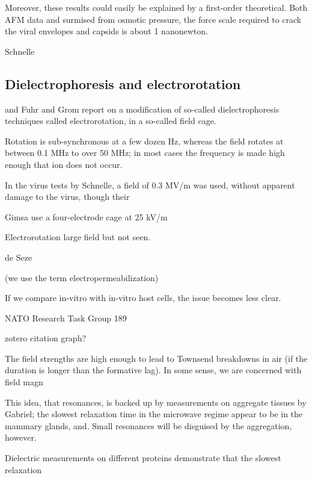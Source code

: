 \documentclass[paper.tex]{subfiles}
\begin{document}
\begin{multicols}{1}
Moreover, these results could easily be explained by a first-order theoretical. Both AFM data and surmised from osmotic pressure, the force scale required to crack the viral envelopes and capsids is about 1 nanonewton. 

Schnelle\cite{Trapping1996} 

\subsection{Dielectrophoresis and electrorotation}

and Fuhr\cite{Radiofrequency1994} and Grom \cite{Accumulation2006} report on a modification of so-called dielectrophoresis techniques called electrorotation, in a so-called field cage.
 
 
Rotation is sub-synchronous at a few dozen Hz, whereas the field rotates at between 0.1 MHz to over 50 MHz; in most cases the frequency is made high enough that ion does not occur.

In the virus tests by Schnelle, a field of 0.3 MV/m was used, without apparent damage to the virus, though their 

Gimsa \cite{New1999} use a four-electrode cage at 25 kV/m 

Electrorotation large field but not seen.

de Seze





\pagebreak

(we use the term electropermeabilization)


If we compare in-vitro with in-vitro host cells, the issue becomes less clear.


NATO Research Task Group 189 \cite{treatyelectromagnetic}

zotero citation graph?


The field strengths are high enough to lead to Townsend breakdowns in air (if the duration is longer than the formative lag). In some sense, we are concerned with field magn

This idea, that resonances, is backed up by measurements on aggregate tissues by Gabriel; the slowest relaxation time in the microwave regime appear to be in the mammary glands, and. Small resonances will be disguised by the aggregation, however.


Dielectric measurements on different proteins demonstrate that the slowest relaxation 









\end{multicols}
\end{document}
